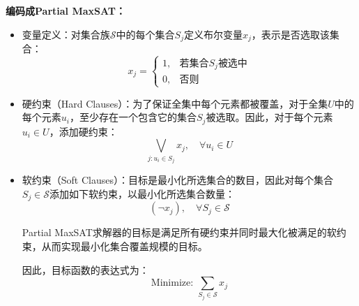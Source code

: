 \documentclass{article}
\begin{document}
\textbf{编码成Partial MaxSAT：}
\begin{itemize}
    \item 变量定义：对集合族$\mathcal{S}$中的每个集合$S_j$定义布尔变量$x_j$，表示是否选取该集合：
    \[
    x_j = 
    \begin{cases}
        1, & \text{若集合$S_j$被选中}\\[4pt]
        0, & \text{否则}
    \end{cases}
    \]

    \item 硬约束（Hard Clauses）：为了保证全集中每个元素都被覆盖，对于全集$U$中的每个元素$u_i$，至少存在一个包含它的集合$S_j$被选取。因此，对于每个元素$u_i \in U$，添加硬约束：
    \[
    \bigvee_{j:u_i \in S_j} x_j,\quad\forall u_i\in U
    \]

    \item 软约束（Soft Clauses）：目标是最小化所选集合的数目，因此对每个集合$S_j\in\mathcal{S}$添加如下软约束，以最小化所选集合数量：
    \[
    (\neg x_j),\quad\forall S_j\in \mathcal{S}
    \]

    Partial MaxSAT求解器的目标是满足所有硬约束并同时最大化被满足的软约束，从而实现最小化集合覆盖规模的目标。

    因此，目标函数的表达式为：
    \[
    \text{Minimize: } \sum_{S_j \in \mathcal{S}} x_j
    \]

\end{itemize}
\newpage
\end{document}
